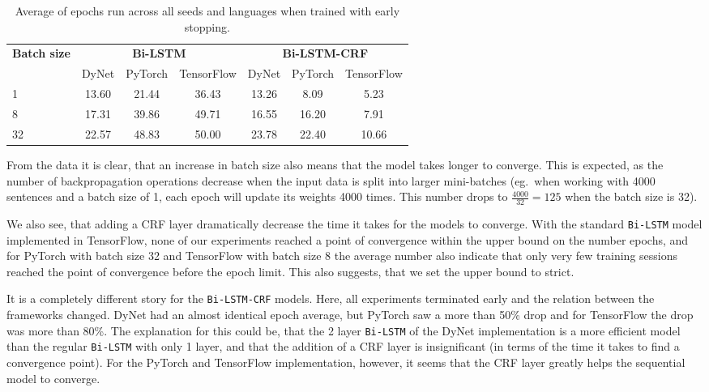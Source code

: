\begin{table}[h!]
    \centering
    \begin{tabular}{l c c c|c c c}
        \toprule
        \multirow{2}{*}{\bfseries Batch size}     &
        \multicolumn{3}{c}{\bfseries Bi-LSTM}     &
        \multicolumn{3}{c}{\bfseries Bi-LSTM-CRF} \\
        \cmidrule(lr){2-7}
        & DyNet & PyTorch & TensorFlow
        & DyNet & PyTorch & TensorFlow \\
        \cmidrule(lr){1-7}
         1 & 13.60 & 21.44 & 36.43 & 13.26 &  8.09 &  5.23 \\
         8 & 17.31 & 39.86 & 49.71 & 16.55 & 16.20 &  7.91 \\
        32 & 22.57 & 48.83 & 50.00 & 23.78 & 22.40 & 10.66 \\
        \bottomrule
    \end{tabular}
    \caption{Average of epochs run across all seeds and languages when trained
        with early stopping.
    }\label{table:epochs-run-pos}
\end{table}

From the data it is clear, that an increase in batch size also means that the
model takes longer to converge. This is expected, as the number of
backpropagation operations decrease when the input data is split into larger
mini-batches (eg.\ when working with 4000 sentences and a batch size of 1, each
epoch will update its weights 4000 times. This number drops to
$\frac{4000}{32}=125$ when the batch size is 32).

We also see, that adding a CRF layer dramatically decrease the time it takes for
the models to converge. With the standard \texttt{Bi-LSTM} model implemented in
TensorFlow, none of our experiments reached a point of convergence within the
upper bound on the number epochs, and for PyTorch with batch size 32 and
TensorFlow with batch size 8 the average number also indicate that only very few
training sessions reached the point of convergence before the epoch limit. This
also suggests, that we set the upper bound to strict.

It is a completely different story for the \texttt{Bi-LSTM-CRF} models. Here,
all experiments terminated early and the relation between the frameworks
changed.  DyNet had an almost identical epoch average, but PyTorch saw a more
than 50\% drop and for TensorFlow the drop was more than 80\%. The explanation
for this could be, that the 2 layer \texttt{Bi-LSTM} of the DyNet implementation
is a more efficient model than the regular \texttt{Bi-LSTM} with only 1 layer,
and that the addition of a CRF layer is insignificant (in terms of the time it
takes to find a convergence point). For the PyTorch and TensorFlow
implementation, however, it seems that the CRF layer greatly helps the
sequential model to converge.


